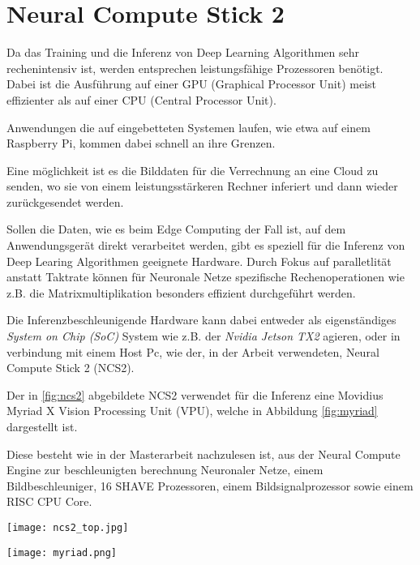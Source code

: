 \section{Neural Compute Stick 2}\label{ncs2}

Da das Training und die Inferenz von Deep Learning Algorithmen
sehr rechenintensiv ist, werden entsprechen leistungsfähige 
Prozessoren benötigt. Dabei ist die Ausführung auf einer GPU 
(Graphical Processor Unit) meist effizienter als auf einer 
CPU (Central Processor Unit).

Anwendungen die auf eingebetteten Systemen laufen, wie etwa 
auf einem Raspberry Pi, kommen dabei schnell an ihre 
Grenzen.

Eine möglichkeit ist es die Bilddaten für die 
Verrechnung an eine Cloud zu senden, wo sie 
von einem leistungsstärkeren Rechner inferiert und 
dann wieder zurückgesendet werden.

Sollen die Daten, wie es beim Edge Computing der Fall ist, 
auf dem Anwendungsgerät direkt verarbeitet werden,
gibt es speziell für die Inferenz von Deep Learing Algorithmen
geeignete Hardware.
Durch Fokus auf paralletlität anstatt Taktrate können 
für Neuronale Netze spezifische Rechenoperationen 
wie z.B. die Matrixmultiplikation besonders effizient 
durchgeführt werden.

Die Inferenzbeschleunigende Hardware kann dabei entweder
als eigenständiges \textit{System on Chip (SoC)}
System wie z.B. der \textit{Nvidia Jetson TX2} agieren, oder
in verbindung mit einem Host Pc, wie der, in der Arbeit 
verwendeten, Neural Compute Stick 2 (NCS2).

Der in \ref{fig:ncs2} abgebildete NCS2 verwendet 
für die Inferenz eine Movidius Myriad X Vision Processing Unit (VPU),
welche in Abbildung \ref{fig:myriad} dargestellt ist.

Diese besteht wie in der Masterarbeit
\cite{haussermannFunktionUndEffizienz}
nachzulesen ist, aus der Neural Compute Engine 
zur beschleunigten berechnung Neuronaler Netze, einem
Bildbeschleuniger, 16 SHAVE Prozessoren, einem 
Bildsignalprozessor sowie einem RISC CPU Core.

\vspace{1cm}
\begin{minipage}{0.4\textwidth}
    \centering
    \texttt{[image: ncs2\_top.jpg]}
    \label{fig:ncs2}
\end{minipage}
\begin{minipage}{0.6\textwidth}
    \centering
    \texttt{[image: myriad.png]}
    \label{fig:myriad}
\end{minipage}


